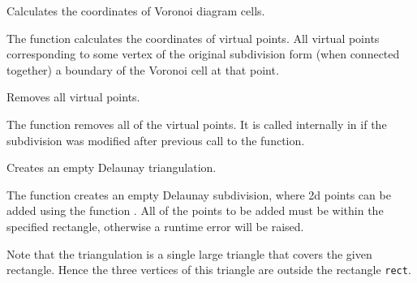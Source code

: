Calculates the coordinates of Voronoi diagram cells.


\begin{description}
\end{description}

The function calculates the coordinates
of virtual points. All virtual points corresponding to some vertex of the
original subdivision form (when connected together) a boundary of the Voronoi
cell at that point.

Removes all virtual points.


\begin{description}
\end{description}

The function removes all of the virtual points. It
is called internally in  if the subdivision
was modified after previous call to the function.


Creates an empty Delaunay triangulation.


\begin{description}
\end{description}

The function creates an empty Delaunay
subdivision, where 2d points can be added using the function
. All of the points to be added must be within
the specified rectangle, otherwise a runtime error will be raised.

Note that the triangulation is a single large triangle that covers the given rectangle.  Hence the three vertices of this triangle are outside the rectangle \texttt{rect}.

